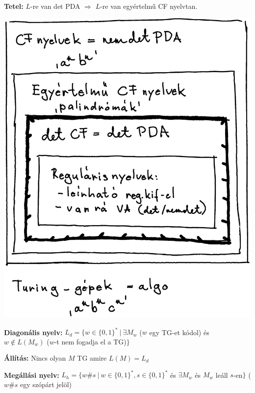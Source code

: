 \documentclass[a4paper]{article}
\begin{document}
\begin{tcolorbox}[size = fbox]
  \textbf{Tetel:} $L$-re van det PDA $\Rightarrow$ $L$-re van egyértelmű CF nyelvtan.
\end{tcolorbox}

\begin{center}
  \includegraphics[scale=0.2]{images/image-1}
\end{center}

\begin{tcolorbox}[size = fbox]
  \textbf{Diagonális nyelv:} $L_d = \{ w \in \{0,1\}^*\ |\ \exists M_w $ ($w$ egy TG-et kódol) és $w \notin L(M_w)$ ($w$-t nem fogadja el a TG)$\}$ 
\end{tcolorbox}

\begin{tcolorbox}[size = fbox]
  \textbf{Állítás:} Nincs olyan $M$ TG amire $L(M) = L_d$
\end{tcolorbox}

\begin{tcolorbox}[size = fbox]
  \textbf{Megállási nyelv:} $L_h = \{ w\#s \ |\ w \in \{0,1\}^*, s \in \{0,1\}^*$ és $\exists M_w$ és $M_w$ leáll $s$-en$\}$ ($w\#s$ egy szópárt jelöl)
\end{tcolorbox}
\end{document}
